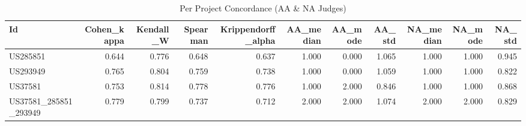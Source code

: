 \begin{table}
\caption{Per Project Concordance (AA & NA Judges)}
\label{tab:per_project_concordance_AA_NA_judges}
\begin{tabular}{lrrrrrrrrrr}
\toprule
Id & Cohen_kappa & Kendall_W & Spearman & Krippendorff_alpha & AA_median & AA_mode & AA_std & NA_median & NA_mode & NA_std \\
\midrule
US285851 & 0.644 & 0.776 & 0.648 & 0.637 & 1.000 & 0.000 & 1.065 & 1.000 & 1.000 & 0.945 \\
US293949 & 0.765 & 0.804 & 0.759 & 0.738 & 1.000 & 0.000 & 1.059 & 1.000 & 1.000 & 0.822 \\
US37581 & 0.753 & 0.814 & 0.778 & 0.776 & 1.000 & 2.000 & 0.846 & 1.000 & 1.000 & 0.868 \\
US37581_285851_293949 & 0.779 & 0.799 & 0.737 & 0.712 & 2.000 & 2.000 & 1.074 & 2.000 & 2.000 & 0.829 \\
\bottomrule
\end{tabular}
\end{table}
